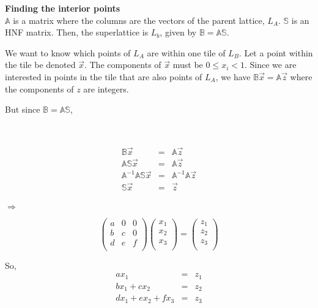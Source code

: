 \documentclass[11pt]{article}
\begin{document}
\textbf{Finding the interior points}\\
$\mathbb{A}$ is a matrix where the columns are the vectors of the
parent lattice, $L_A$. $\mathbb{S}$ is an HNF matrix. Then, the superlattice
is $L_b$, given by $\mathbb{B=AS}$.

We want to know which points of $L_A$ are within one tile of
$L_B$. Let a point within the tile be denoted $\vec x$. The components
of $\vec x$ must be $0\leq x_i<1$. Since we are interested in points
in the tile that are also points of $L_A$, we have
$\mathbb{B}\vec x = \mathbb{A}\vec z$ where the components of $z$
are integers.

But since $\mathbb{B=AS}$,\\
\parbox{2cm}{\ }
\parbox{5cm}{
\begin{eqnarray*}
\mathbb{B}\vec x& = & \mathbb{A}\vec z\\
\mathbb{AS}\vec x& = &\mathbb{A}\vec z\\
\mathbb{A}^{-1}\mathbb{AS}\vec x& = &\mathbb{A}^{-1}\mathbb{A}\vec z\\
\mathbb{S}\vec x& = &\vec z\\
\end{eqnarray*}
}$\Rightarrow$
\parbox{5cm}{\[
\left(\begin{array}{ccc}
a&0&0\\
b&c&0\\
d&e&f\\
\end{array}\right)
\left(\begin{array}{c}
x_1\\
x_2\\
x_3\\
\end{array}\right)
=
\left(\begin{array}{c}
z_1\\
z_2\\
z_3\\ 
\end{array}\right)\]}

So, 
\begin{eqnarray*}
ax_1&=&z_1\\
bx_1+cx_2&=&z_2\\
dx_1+ex_2+fx_3&=&z_3\\
\end{eqnarray*}
\end{document}
